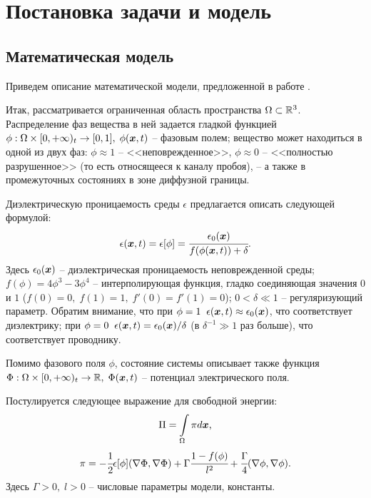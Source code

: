 
\section{Постановка задачи и модель}

\subsection{Математическая модель}

Приведем описание математической модели, предложенной в работе \cite{pitike_dielectric_breakdown}.

Итак, рассматривается ограниченная область пространства $\Omega \subset {\mathbb{R}}^3$. Распределение фаз вещества в ней задается гладкой функцией $\phi: \Omega \times [0, +\infty)_t \to [0, 1], \; \phi({\boldsymbol{x}}, t)$ -- фазовым полем; вещество может находиться в одной из двух фаз: $\phi \approx 1$ -- <<неповрежденное>>, $\phi \approx 0$ -- <<полностью разрушенное>> (то есть относящееся к каналу пробоя), -- а также в промежуточных состояниях в зоне диффузной границы.

Диэлектрическую проницаемость среды $\epsilon$ предлагается описать следующей формулой:
\begin{equation}
	\epsilon({\boldsymbol{x}}, t) = \epsilon[\phi] = \cfrac{\epsilon_0({\boldsymbol{x}})}{f(\phi({\boldsymbol{x}}, t)) + \delta} {\text{.}}
	\label{eq:epsilon}
\end{equation}
Здесь $\epsilon_0({\boldsymbol{x}})$ -- диэлектрическая проницаемость неповрежденной среды; $f(\phi) = 4\phi^3 - 3\phi^4$ -- интерполирующая функция, гладко соединяющая значения $0$ и $1$ ($f(0) = 0, \; f(1) = 1, \; f'(0) = f'(1) = 0$); $0 < \delta \ll 1$ -- регуляризующий параметр. Обратим внимание, что при $\phi = 1 \;\; \epsilon({\boldsymbol{x}}, t) \approx \epsilon_0({\boldsymbol{x}})$, что соответствует диэлектрику; при $\phi = 0 \;\; \epsilon({\boldsymbol{x}}, t) = \epsilon_0({\boldsymbol{x}}) / \delta$ (в $\delta^{-1} \gg 1$ раз больше), что соответствует проводнику.

Помимо фазового поля $\phi$, состояние системы описывает также функция $\Phi: \Omega \times [0, +\infty)_t \to {\mathbb{R}}, \; \Phi({\boldsymbol{x}}, t)$ -- потенциал электрического поля.

Постулируется следующее выражение для свободной энергии:
\begin{equation}
	\Pi = \int \limits_\Omega \pi d {\boldsymbol{x}} {\text{,}}
	\label{eq:free_energy}
\end{equation}
\begin{equation}
	\pi = -\cfrac{1}{2} \epsilon[\phi] (\nabla \Phi, \nabla \Phi) + \Gamma \cfrac{1 - f(\phi)}{l^2} + \cfrac{\Gamma}{4} (\nabla \phi, \nabla \phi) {\text{.}}
	\label{eq:free_energy_density}
\end{equation}
Здесь $\Gamma > 0, \; l > 0$ -- числовые параметры модели, константы.

